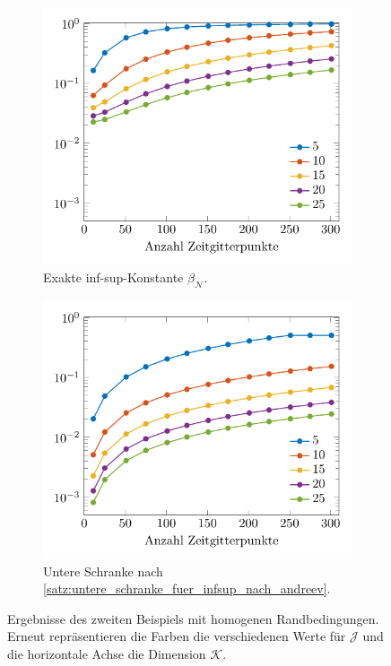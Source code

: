\documentclass[../main.tex]{subfiles}
\begin{document}
\begin{figure}[p]
    \centering
    \centering
    \begin{subfigure}[b]{0.495\textwidth}
        \centering
        \includegraphics[width=1\textwidth]{figures/chapter4/stability_sine_dataset2_fig_1.pdf}
        \caption{Exakte inf-sup-Konstante $\beta_{\mathcal N}$.}
    \end{subfigure}
    \begin{subfigure}[b]{0.495\textwidth}
        \centering
        \includegraphics[width=1\textwidth]{figures/chapter4/stability_sine_dataset2_fig_2.pdf}
        \caption{Untere Schranke nach \cref{satz:untere_schranke_fuer_infsup_nach_andreev}.}
    \end{subfigure}
    \caption[Stabilität der Diskretisierung mit homogenen Randbedingungen, zweites Beispiel.]{%
        Ergebnisse des zweiten Beispiels mit homogenen Randbedingungen.
        Erneut repräsentieren die Farben die verschiedenen Werte für $\mathcal J$ und die horizontale Achse die Dimension $\mathcal K$.
        }
    \label{figure:infsup_homogen_zwei_felder}
\end{figure}
\end{document}
